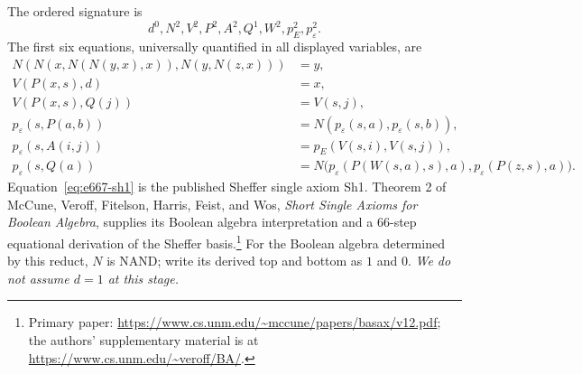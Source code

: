 The ordered signature is
\[
 d^0,N^2,V^2,P^2,A^2,Q^1,W^2,p_E^2,p_\varepsilon^2.
\]
The first six equations, universally quantified in all displayed
variables, are
\begin{align}
 N(N(x,N(N(y,x),x)),N(y,N(z,x)))&=y,
       \label{eq:e667-sh1}\\
 V(P(x,s),d)&=x,\label{eq:e667-head}\\
 V(P(x,s),Q(j))&=V(s,j),\label{eq:e667-tail}\\
 p_\varepsilon(s,P(a,b))
     &=N(p_\varepsilon(s,a),p_\varepsilon(s,b)),
       \label{eq:e667-nand}\\
 p_\varepsilon(s,A(i,j))
     &=p_E(V(s,i),V(s,j)),\label{eq:e667-atom}\\
 p_\varepsilon(s,Q(a))
     &=N\bigl(p_\varepsilon(P(W(s,a),s),a),
               p_\varepsilon(P(z,s),a)\bigr).
       \label{eq:e667-binder}
\end{align}
Equation~\eqref{eq:e667-sh1} is the published Sheffer single axiom Sh1.
Theorem 2 of McCune, Veroff, Fitelson, Harris, Feist, and Wos,
\emph{Short Single Axioms for Boolean Algebra}, supplies its Boolean
algebra interpretation and a 66-step equational derivation of the
Sheffer basis.\footnote{Primary paper:
\url{https://www.cs.unm.edu/~mccune/papers/basax/v12.pdf};
the authors' supplementary material is at
\url{https://www.cs.unm.edu/~veroff/BA/}.}
For the Boolean algebra determined by this reduct, $N$ is NAND;
write its derived top and bottom as $1$ and $0$.
\emph{We do not assume $d=1$ at this stage.}

